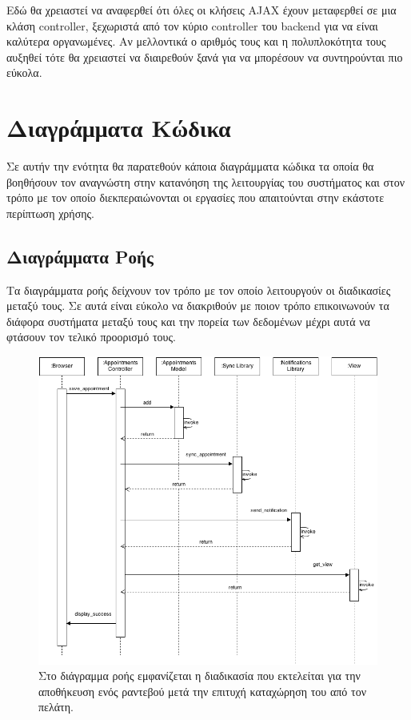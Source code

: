 Εδώ θα χρειαστεί να αναφερθεί ότι όλες οι κλήσεις AJAX έχουν μεταφερθεί σε μια κλάση controller, ξεχωριστά από τον κύριο controller του backend για να είναι καλύτερα οργανωμένες. Αν μελλοντικά ο αριθμός τους και η πολυπλοκότητα τους αυξηθεί τότε θα χρειαστεί να διαιρεθούν ξανά για να μπορέσουν να συντηρούνται πιο εύκολα.

\section{Διαγράμματα Κώδικα}
Σε αυτήν την ενότητα θα παρατεθούν κάποια διαγράμματα κώδικα τα οποία θα βοηθήσουν τον αναγνώστη στην κατανόηση της λειτουργίας του συστήματος και στον τρόπο με τον οποίο διεκπεραιώνονται οι εργασίες που απαιτούνται στην εκάστοτε περίπτωση χρήσης.

\subsection{Διαγράμματα Ροής}
Τα διαγράμματα ροής δείχνουν τον τρόπο με τον οποίο λειτουργούν οι διαδικασίες μεταξύ τους. Σε αυτά είναι εύκολο να διακριθούν με ποιον τρόπο επικοινωνούν τα διάφορα συστήματα μεταξύ τους και την πορεία των δεδομένων μέχρι αυτά να φτάσουν τον τελικό προορισμό τους. 

\begin{figure}[!htb]
\centering
\includegraphics[width=150mm]{images/sd-save-appointment.png}
\caption{Στο διάγραμμα ροής εμφανίζεται η διαδικασία που εκτελείται για την αποθήκευση ενός ραντεβού μετά την επιτυχή καταχώρηση του από τον πελάτη.}
\label{sd-save-appointment}
\end{figure}

